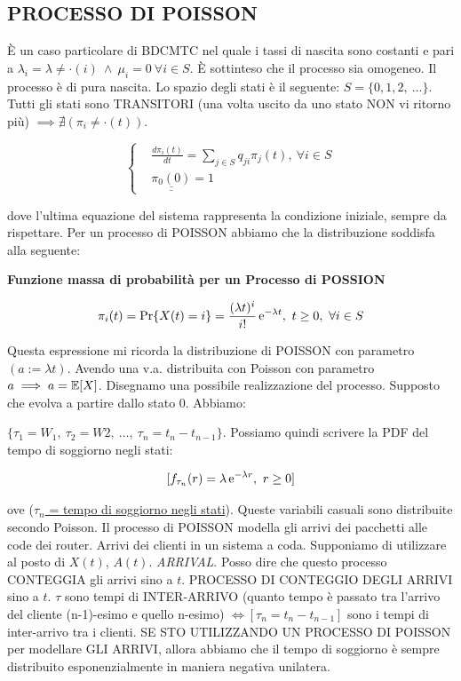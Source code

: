 \newpage

\subsection{PROCESSO DI POISSON}

\`E un caso particolare di BDCMTC nel quale i tassi di nascita sono costanti e pari a $\lambda_i = \lambda \neq \mathord{\cdot}(i)\ \land\ \mu_i = 0\ \forall i\in S$. \`E sottinteso che il processo sia omogeneo. Il processo è di pura nascita. Lo spazio degli stati è il seguente: $S = \{0,1,2,\ \dots\}$. Tutti gli stati sono TRANSITORI (una volta uscito da uno stato NON vi ritorno più) $\implies \nexists (\pi_i \neq \mathord{\cdot}(t))$. 

\[
	\left\{
	\begin{aligned}
	&\frac{d \pi_i(t)}{dt} = \sum_{j\in S}{q_{ji}\pi_j(t)},\ \forall i\in S\\
	&\underline{\underline{\pi_0(0)}} = 1
	\end{aligned}
	\right.
\]

dove l'ultima equazione del sistema rappresenta la condizione iniziale, sempre da rispettare. Per un processo di POISSON abbiamo che la distribuzione soddisfa alla seguente:

\begin{defn}{\textbf{Funzione massa di probabilità per un Processo di POSSION}}

\[
	\pi_i(t) = \Pr\{X(t) = i\} = \frac{(\lambda t)^i}{i!}\mathop{}\!\mathrm{e}^{-\lambda t},\ t\geq 0,\ \forall i\in S
\]

\end{defn}

Questa espressione mi ricorda la distribuzione di POISSON con parametro $(a := \lambda t)$. Avendo una v.a. distribuita con Poisson con parametro $a \implies a = \operatorname{\mathbb{E}}[X]$. Disegnamo una possibile realizzazione del processo. Supposto che evolva a partire dallo stato 0. Abbiamo:

$\{\tau_1 = W_1,\ \tau_2 = W2,\ \dots,\ \tau_n = t_n-t_{n-1}\}$. Possiamo quindi scrivere la PDF del tempo di soggiorno negli stati:

\[
	[f_{\tau_n}(r) = \lambda\mathop{}\!\mathrm{e}^{-\lambda r},\ r \geq 0]
\]

ove (\underline{$\tau_n$ = tempo di soggiorno negli stati}). Queste variabili casuali sono distribuite secondo Poisson. Il processo di POISSON modella gli arrivi dei pacchetti alle code dei router. Arrivi dei clienti in un sistema a coda. Supponiamo di utilizzare al posto di $X(t)$, $A(t)$. \textit{ARRIVAL}. Posso dire che questo processo CONTEGGIA gli arrivi sino a $t$. PROCESSO DI CONTEGGIO DEGLI ARRIVI sino a $t$. $\tau$ sono tempi di INTER-ARRIVO (quanto tempo è passato tra l'arrivo del cliente (n-1)-esimo e quello n-esimo) $\iff [\tau_n = t_n - t_{n-1}]$ sono i tempi di inter-arrivo tra i clienti. SE STO UTILIZZANDO UN PROCESSO DI POISSON per modellare GLI ARRIVI, allora abbiamo che il tempo di soggiorno è sempre distribuito esponenzialmente in maniera negativa unilatera. 

